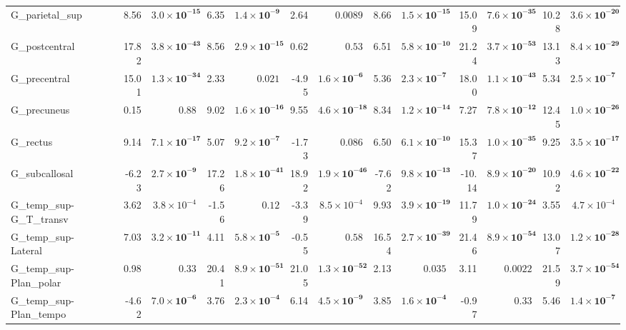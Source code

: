 {\begin{longtable}{llrrrrrrrrrrrr}
G\_parietal\_sup &  & 8.56 & $\mathbf{3.0{\times}10^{-15}}$ & 6.35 & $\mathbf{1.4{\times}10^{-9}}$ & 2.64 & $0.0089$ & 8.66 & $\mathbf{1.5{\times}10^{-15}}$ & 15.09 & $\mathbf{7.6{\times}10^{-35}}$ & 10.28 & $\mathbf{3.6{\times}10^{-20}}$ \\
G\_postcentral &  & 17.82 & $\mathbf{3.8{\times}10^{-43}}$ & 8.56 & $\mathbf{2.9{\times}10^{-15}}$ & 0.62 & $0.53$ & 6.51 & $\mathbf{5.8{\times}10^{-10}}$ & 21.24 & $\mathbf{3.7{\times}10^{-53}}$ & 13.13 & $\mathbf{8.4{\times}10^{-29}}$ \\
G\_precentral &  & 15.01 & $\mathbf{1.3{\times}10^{-34}}$ & 2.33 & $0.021$ & -4.95 & $\mathbf{1.6{\times}10^{-6}}$ & 5.36 & $\mathbf{2.3{\times}10^{-7}}$ & 18.00 & $\mathbf{1.1{\times}10^{-43}}$ & 5.34 & $\mathbf{2.5{\times}10^{-7}}$ \\
G\_precuneus &  & 0.15 & $0.88$ & 9.02 & $\mathbf{1.6{\times}10^{-16}}$ & 9.55 & $\mathbf{4.6{\times}10^{-18}}$ & 8.34 & $\mathbf{1.2{\times}10^{-14}}$ & 7.27 & $\mathbf{7.8{\times}10^{-12}}$ & 12.45 & $\mathbf{1.0{\times}10^{-26}}$ \\
G\_rectus &  & 9.14 & $\mathbf{7.1{\times}10^{-17}}$ & 5.07 & $\mathbf{9.2{\times}10^{-7}}$ & -1.73 & $0.086$ & 6.50 & $\mathbf{6.1{\times}10^{-10}}$ & 15.37 & $\mathbf{1.0{\times}10^{-35}}$ & 9.25 & $\mathbf{3.5{\times}10^{-17}}$ \\
G\_subcallosal &  & -6.23 & $\mathbf{2.7{\times}10^{-9}}$ & 17.26 & $\mathbf{1.8{\times}10^{-41}}$ & 18.92 & $\mathbf{1.9{\times}10^{-46}}$ & -7.62 & $\mathbf{9.8{\times}10^{-13}}$ & -10.14 & $\mathbf{8.9{\times}10^{-20}}$ & 10.92 & $\mathbf{4.6{\times}10^{-22}}$ \\
G\_temp\_sup-G\_T\_transv &  & 3.62 & $3.8{\times}10^{-4}$ & -1.56 & $0.12$ & -3.39 & $8.5{\times}10^{-4}$ & 9.93 & $\mathbf{3.9{\times}10^{-19}}$ & 11.79 & $\mathbf{1.0{\times}10^{-24}}$ & 3.55 & $4.7{\times}10^{-4}$ \\
G\_temp\_sup-Lateral &  & 7.03 & $\mathbf{3.2{\times}10^{-11}}$ & 4.11 & $\mathbf{5.8{\times}10^{-5}}$ & -0.55 & $0.58$ & 16.54 & $\mathbf{2.7{\times}10^{-39}}$ & 21.46 & $\mathbf{8.9{\times}10^{-54}}$ & 13.07 & $\mathbf{1.2{\times}10^{-28}}$ \\
G\_temp\_sup-Plan\_polar &  & 0.98 & $0.33$ & 20.41 & $\mathbf{8.9{\times}10^{-51}}$ & 21.05 & $\mathbf{1.3{\times}10^{-52}}$ & 2.13 & $0.035$ & 3.11 & $0.0022$ & 21.59 & $\mathbf{3.7{\times}10^{-54}}$ \\
G\_temp\_sup-Plan\_tempo &  & -4.62 & $\mathbf{7.0{\times}10^{-6}}$ & 3.76 & $\mathbf{2.3{\times}10^{-4}}$ & 6.14 & $\mathbf{4.5{\times}10^{-9}}$ & 3.85 & $\mathbf{1.6{\times}10^{-4}}$ & -0.97 & $0.33$ & 5.46 & $\mathbf{1.4{\times}10^{-7}}$ \\

\end{longtable}}
